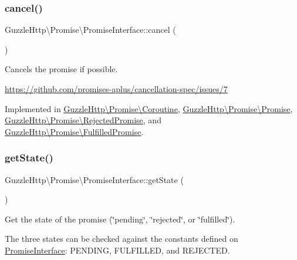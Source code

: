 \subsubsection{\texorpdfstring{cancel()}{cancel()}}
{\footnotesize\ttfamily Guzzle\+Http\textbackslash{}\+Promise\textbackslash{}\+Promise\+Interface\+::cancel (\begin{DoxyParamCaption}{ }\end{DoxyParamCaption})}

Cancels the promise if possible.

\hyperlink{}{https\+://github.\+com/promises-\/aplus/cancellation-\/spec/issues/7}

Implemented in \hyperlink{classGuzzleHttp_1_1Promise_1_1Coroutine_a7c999f58d48a3678a4e86b1796232649}{Guzzle\+Http\textbackslash{}\+Promise\textbackslash{}\+Coroutine}, \hyperlink{classGuzzleHttp_1_1Promise_1_1Promise_a5e84ab7b355948f9e5ce0ee5ae76d864}{Guzzle\+Http\textbackslash{}\+Promise\textbackslash{}\+Promise}, \hyperlink{classGuzzleHttp_1_1Promise_1_1RejectedPromise_a57da0985dd2da478314844a4a1b7d781}{Guzzle\+Http\textbackslash{}\+Promise\textbackslash{}\+Rejected\+Promise}, and \hyperlink{classGuzzleHttp_1_1Promise_1_1FulfilledPromise_a2a1ed3ce2a277fef457c47e347ce3b8a}{Guzzle\+Http\textbackslash{}\+Promise\textbackslash{}\+Fulfilled\+Promise}.

\mbox{\label{interfaceGuzzleHttp_1_1Promise_1_1PromiseInterface_a4473485faedc0b6489ff28b4fbdc2330}} 
\subsubsection{\texorpdfstring{get\+State()}{getState()}}
{\footnotesize\ttfamily Guzzle\+Http\textbackslash{}\+Promise\textbackslash{}\+Promise\+Interface\+::get\+State (\begin{DoxyParamCaption}{ }\end{DoxyParamCaption})}

Get the state of the promise (\char`\"{}pending\char`\"{}, \char`\"{}rejected\char`\"{}, or \char`\"{}fulfilled\char`\"{}).

The three states can be checked against the constants defined on \hyperlink{interfaceGuzzleHttp_1_1Promise_1_1PromiseInterface}{Promise\+Interface}\+: P\+E\+N\+D\+I\+NG, F\+U\+L\+F\+I\+L\+L\+ED, and R\+E\+J\+E\+C\+T\+ED.

